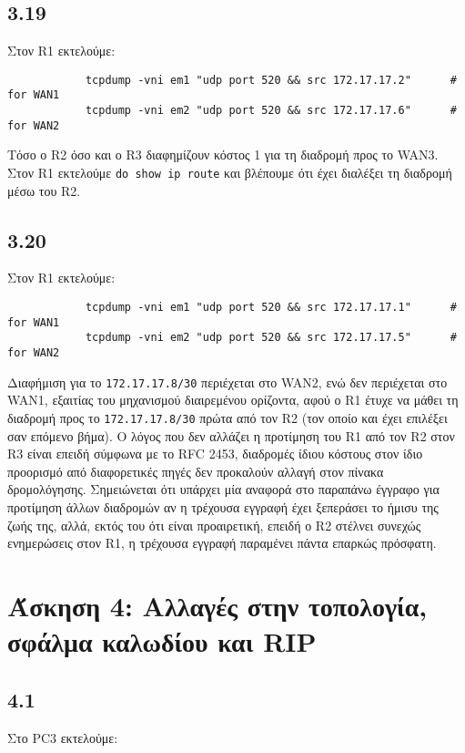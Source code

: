 \documentclass[a4paper, 12pt]{article}
\begin{document}
	\subsection*{3.19}
		Στον R1 εκτελούμε:
		
		\begin{verbatim}
			tcpdump -vni em1 "udp port 520 && src 172.17.17.2"      # for WAN1
			tcpdump -vni em2 "udp port 520 && src 172.17.17.6"      # for WAN2
		\end{verbatim}
		
		Τόσο ο R2 όσο και ο R3 διαφημίζουν κόστος 1 για τη διαδρομή προς το WAN3. \\
		
		Στον R1 εκτελούμε \verb|do show ip route| και βλέπουμε ότι έχει διαλέξει τη διαδρομή μέσω του R2.

	\subsection*{3.20}
		Στον R1 εκτελούμε:
		
		\begin{verbatim}
			tcpdump -vni em1 "udp port 520 && src 172.17.17.1"      # for WAN1
			tcpdump -vni em2 "udp port 520 && src 172.17.17.5"      # for WAN2
		\end{verbatim}
		
		Διαφήμιση για το \verb|172.17.17.8/30| περιέχεται στο WAN2, ενώ δεν περιέχεται στο WAN1, εξαιτίας του μηχανισμού διαιρεμένου ορίζοντα, αφού ο R1 έτυχε να μάθει τη διαδρομή προς το \verb|172.17.17.8/30| πρώτα από τον R2 (τον οποίο και έχει επιλέξει σαν επόμενο βήμα). Ο λόγος που δεν αλλάζει η προτίμηση του R1 από τον R2 στον R3 είναι επειδή σύμφωνα με το RFC 2453, διαδρομές ίδιου κόστους στον ίδιο προορισμό από διαφορετικές πηγές δεν προκαλούν αλλαγή στον πίνακα δρομολόγησης. Σημειώνεται ότι υπάρχει μία αναφορά στο παραπάνω έγγραφο για προτίμηση άλλων διαδρομών αν η τρέχουσα εγγραφή έχει ξεπεράσει το ήμισυ της ζωής της, αλλά, εκτός του ότι είναι προαιρετική, επειδή ο R2 στέλνει συνεχώς ενημερώσεις στον R1, η τρέχουσα εγγραφή παραμένει πάντα επαρκώς πρόσφατη.  

\section*{Άσκηση 4: Αλλαγές στην τοπολογία, σφάλμα καλωδίου και RIP}

	\subsection*{4.1}
		Στο PC3 εκτελούμε:
		
\end{document}
